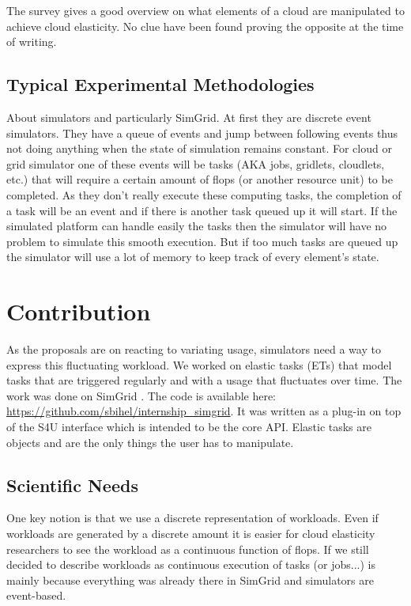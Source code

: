 \documentclass[a4paper, onecolumn, 11pt]{article}
\begin{document}
  The survey gives a good overview on what elements of a cloud are manipulated
  to achieve cloud elasticity. No clue have been found proving the opposite at
  the time of writing.
  
  \subsection{Typical Experimental Methodologies}
  
  About simulators and particularly SimGrid. At first they are discrete event 
  simulators. They have a queue of events and jump between following events 
  thus not doing anything when the state of simulation remains constant. For 
  cloud or grid simulator one of these events will be tasks (AKA jobs, 
  gridlets, cloudlets, etc.) that will require a certain amount of flops (or 
  another resource unit) to be completed. As they don't really execute these 
  computing tasks, the completion of a task will be an event and if there is 
  another task queued up it will start. If the simulated platform can handle 
  easily the tasks then the simulator will have no problem to simulate this 
  smooth execution. But if too much tasks are queued up the simulator will use 
  a lot of memory to keep track of every element's state.


\section{Contribution} \label{contrib}
As the proposals are on reacting to variating usage, simulators need a way to
express this fluctuating workload. We worked on elastic tasks (ETs) that model
tasks that are triggered regularly and with a usage that fluctuates over time.
The work was done on SimGrid \cite{casanova:hal-01017319}. The code is available
here: \url{https://github.com/sbihel/internship_simgrid}. It was written as a
plug-in on top of the S4U interface which is intended to be the core API.
Elastic tasks are objects and are the only things the user has to manipulate.

  \subsection{Scientific Needs}
  One key notion is that we use a discrete representation of workloads. Even if 
  workloads are generated by a discrete amount it is easier for cloud 
  elasticity researchers to see the workload as a continuous function of flops. 
  If we still decided to describe workloads as continuous execution of tasks 
  (or jobs...) is mainly because everything was already there in SimGrid and 
  simulators are event-based.
   
\end{document}
